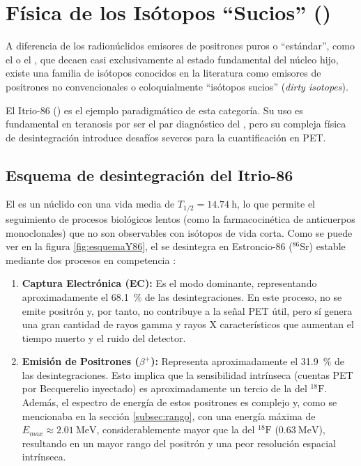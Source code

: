 \section{Física de los Isótopos \enquote{Sucios} (\yochoseis)}
\label{sec:estado_del_arte_fund_teoricos:isotopos_sucios}

A diferencia de los radionúclidos emisores de positrones puros o \enquote{estándar}, como el \fdiezocho o el , que decaen casi exclusivamente al estado fundamental del núcleo hijo, existe una familia de isótopos conocidos en la literatura como emisores de positrones no convencionales o coloquialmente \enquote{isótopos sucios} (\emph{dirty isotopes}).

El Itrio-86 (\yochoseis) es el ejemplo paradigmático de esta categoría. Su uso es fundamental en teranosis por ser el par diagnóstico del \ynuevecero, pero su compleja física de desintegración introduce desafíos severos para la cuantificación en PET.

\subsection{Esquema de desintegración del Itrio-86}
\label{subsec:esquema_y86}


El \yochoseis es un núclido con una vida media de $T_{1/2} = \SI{14.74}{\hour}$, lo que permite el seguimiento de procesos biológicos lentos (como la farmacocinética de anticuerpos monoclonales) que no son observables con isótopos de vida corta. Como se puede ver en la figura \ref{fig:esquemaY86}, el \yochoseis se desintegra en Estroncio-86 ($^{86}\text{Sr}$) estable mediante dos procesos en competencia \parencite{Conti2016}:

\begin{enumerate}
      \item \textbf{Captura Electrónica (EC):} Es el modo dominante, representando aproximadamente el \SI{68.1}{\percent} de las desintegraciones. En este proceso, no se emite positrón y, por tanto, no contribuye a la señal PET útil, pero sí genera una gran cantidad de rayos gamma y rayos X característicos que aumentan el tiempo muerto y el ruido del detector.

      \item \textbf{Emisión de Positrones ($\beta^+$):} Representa aproximadamente el \SI{31.9}{\percent} de las desintegraciones. Esto implica que la sensibilidad intrínseca (cuentas PET por Becquerelio inyectado) es aproximadamente un tercio de la del $^{18}\text{F}$. Además, el espectro de energía de estos positrones es complejo y, como se mencionaba en la sección \ref{subsec:rango}, con una energía máxima de $E_{max} \approx \SI{2.01}{\mega\electronvolt}$, considerablemente mayor que la del $^{18}\text{F}$ ($\SI{0.63}{\mega\electronvolt}$), resultando en un mayor rango del positrón y una peor resolución espacial intrínseca.
\end{enumerate}

